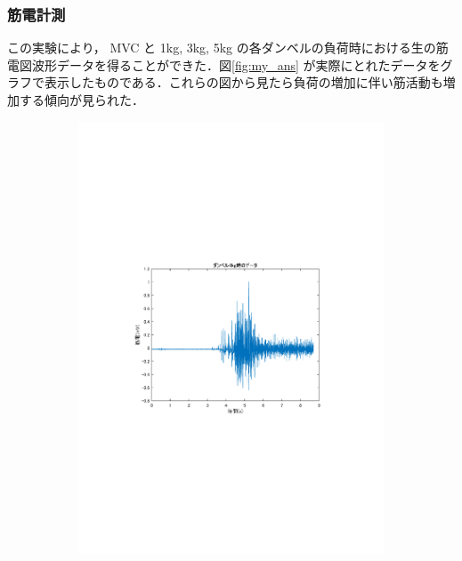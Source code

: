 \documentclass[dvipdfmx, titlepage, t]{jsarticle}
\begin{document}
    \subsubsection{筋電計測}
        この実験により， MVC と 1kg, 3kg, 5kg の各ダンベルの負荷時における生の筋電図波形データを得ることができた．図\ref{fig:my_ans} が実際にとれたデータをグラフで表示したものである．これらの図から見たら負荷の増加に伴い筋活動も増加する傾向が見られた．

\begin{figure}[H] %
    \centering %

    \begin{subfigure}[b]{0.48\linewidth} %
        \centering
        \includegraphics[trim=90 250 100 250 clip,width=\linewidth]{figure/data_1kg.pdf} %

\end{subfigure}
\end{figure}
\end{document}
